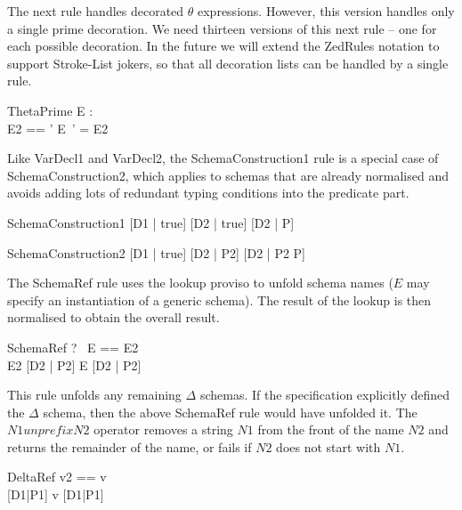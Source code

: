 \documentclass{entcs}
\newcommand{\sexprUnfoldsTo}{\mathrel{=_{se}}}
\newcommand{\declListUnfoldsTo}{\mathrel{=_d}}
\newcommand{\unprefix}{\mathrel{unprefix}}
\begin{document}
The next rule handles decorated $\theta$ expressions.  However, this
version handles only a single prime decoration.  We need thirteen
versions of this next rule -- one for 
each possible decoration.   In the future we will extend the ZedRules
notation to support Stroke-List jokers, so that all decoration lists can
be handled by a single rule.

\begin{zedrule}{ThetaPrime}
  \proviso E : \power [D] \\
  \proviso E2 == \theta [D | true] '
\derives
  \theta E~' = E2
\end{zedrule}

Like VarDecl1 and VarDecl2, the SchemaConstruction1 rule is a special
case of SchemaConstruction2, which applies to schemas that are already
normalised and avoids adding lots of redundant typing conditions into
the predicate part.
\begin{zedrule}{SchemaConstruction1}
  [D1 | true] \declListUnfoldsTo [D2 | true]
\derives
  [D1 | P] \sexprUnfoldsTo [D2 | P]
\end{zedrule}

\begin{zedrule}{SchemaConstruction2}
  [D1 | true] \declListUnfoldsTo [D2 | P2]
\derives
  [D1 | P] \sexprUnfoldsTo [D2 | P2 \land P]
\end{zedrule}

The SchemaRef rule uses the lookup proviso to unfold schema names
($E$ may specify an instantiation of a generic schema).  
The result of the lookup
is then normalised to obtain the overall result.
\begin{zedrule}{SchemaRef}
  \proviso ?~ E == E2 \\
  E2 \sexprUnfoldsTo [D2 | P2]
\derives
  E \sexprUnfoldsTo [D2 | P2]
\end{zedrule}

This rule unfolds any remaining $\Delta$ schemas.
If the specification explicitly defined the $\Delta$ schema,
then the above SchemaRef rule would have unfolded it.
The $N1 \unprefix N2$ operator removes a string $N1$ from the front of
the name $N2$ and returns the remainder of the name, or fails if $N2$
does not start with $N1$.

\begin{zedrule}{DeltaRef}
  \proviso v2 == \Delta \unprefix v \\
  [v2; v2~'] \sexprUnfoldsTo [D1|P1]
\derives
  v \sexprUnfoldsTo [D1|P1]
\end{zedrule}
\end{document}
